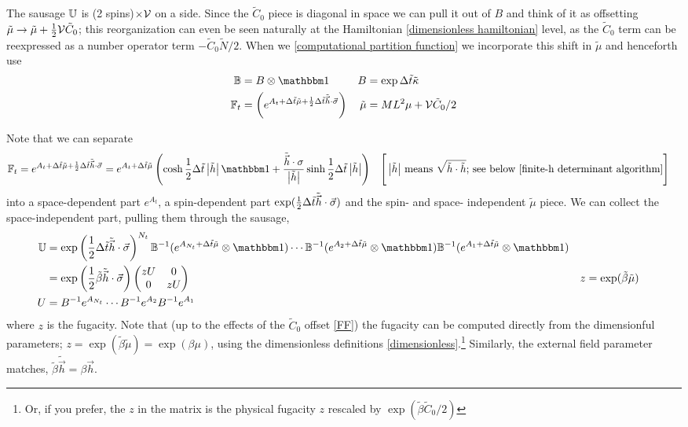 The sausage $\mathbb{U}$ is (2 spins)$\times \mathcal{V}$ on a side.
Since the $\tilde{C}_0$ piece is diagonal in space we can pull it out of $B$ and think of it as offsetting $\tilde{\mu}\rightarrow \tilde{\mu} + \frac{1}{2} \mathcal{V} \tilde{C}_0$; this reorganization can even be seen naturally at the Hamiltonian \eqref{dimensionless hamiltonian} level, as the $\tilde{C}_0$ term can be reexpressed as a number operator term $- \tilde{C}_0 \tilde{N}/2$.
When we  \eqref{computational partition function} we incorporate this shift in $\tilde{\mu}$ and henceforth use
\begin{align}
	\BB &= B \otimes \one
	&
	B &= \exp \Delta\tilde{t} \tilde{\kappa}
	\label{eq:BB}\\
	\FF_t &= \left(e^{A_{t}+\Delta\tilde{t}\tilde{\mu} + \half \Delta\tilde{t}\tilde{\vec{h}}\cdot\vec{\sigma}}\right)
	&
	\tilde{\mu} &= M L^2 \mu +\Volume\tilde{C}_0/2
	\label{eq:FF}
\end{align}

Note that we can separate
\begin{align} 
	\FF_t 
	&= e^{A_{t}+\Delta\tilde{t}\tilde{\mu} + \half \Delta\tilde{t}\tilde{\vec{h}}\cdot\vec{\sigma}}
	= e^{A_t + \Delta\tilde{t}\tilde{\mu}}\left( \cosh \half \Delta\tilde{t} \abs{\tilde{h}} \one + \frac{\tilde{\vec{h}}\cdot \sigma}{\abs{\tilde{h}}}\sinh \half \Delta\tilde{t} \abs{\tilde{h}} \right)
	\label{eq:FF explicitly}
	&
	\Bigg[\abs{\tilde{h}} &\text{ means } \sqrt{\tilde{h}\cdot\tilde{h}}\text{; see below \eqref{finite-h determinant algorithm}}\Bigg]
\end{align}
into a space-dependent part $e^{A_t}$, a spin-dependent part $\exp( \frac{1}{2} \Delta\tilde{t}\tilde{\vec{h}} \cdot \vec{\sigma})$ and the spin- and space- independent $\tilde{\mu}$ piece.
We can collect the space-independent part, pulling them through the sausage,
\begin{align}
	\UU 
	&= \exp\left(\half \Delta\tilde{t} \tilde{\vec{h}}\cdot\vec{\sigma}\right)^{N_t} \BB\inverse (e^{A_{N_t} + \Delta\tilde{t}\tilde{\mu}} \otimes\one)\cdots \BB\inverse (e^{A_2 + \Delta\tilde{t}\tilde{\mu}}\otimes\one) \BB\inverse (e^{A_1 + \Delta\tilde{t}\tilde{\mu}}\otimes \one)
	\\
	&= \exp\left(\half \tilde{\beta}\tilde{\vec{h}}\cdot\vec{\sigma}\right) \begin{pmatrix} zU & 0 \\ 0 & zU \end{pmatrix}
	&
	z &= \exp(\tilde{\beta} \tilde{\mu})
	\label{eq:fugacity}\\
	U &= B\inverse e^{A_{N_t}} \cdots B\inverse e^{A_2} B\inverse e^{A_1}
\end{align}
where $z$ is the fugacity.
Note that (up to the effects of the $\tilde{C}_0$ offset \eqref{FF}) the fugacity can be computed directly from the dimensionful parameters; $z=\exp(\tilde{\beta}\tilde{\mu})=\exp(\beta\mu)$, using the dimensionless definitions \eqref{dimensionless}.\footnote{
	Or, if you prefer, the $z$ in the matrix is the physical fugacity $z$ rescaled by $\exp(\tilde{\beta} \tilde{C}_0/2)$
}
Similarly, the external field parameter matches, $\tilde{\beta}\tilde{\vec{h}} = \beta \vec{h}$.

